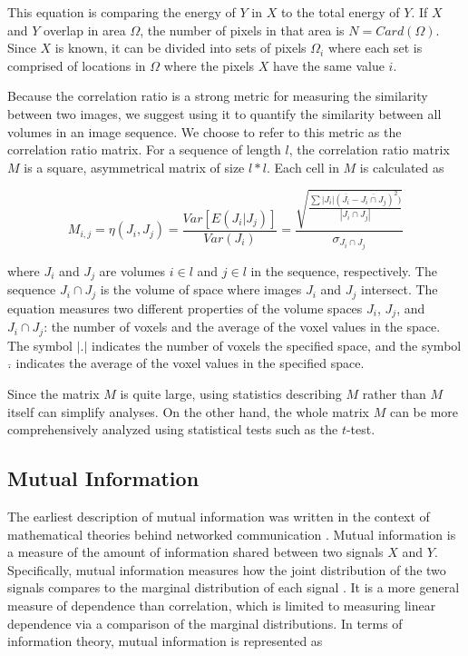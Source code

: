 \noindent This equation is comparing the energy of $Y$ in $X$ to the total energy of $Y$. If $X$ and $Y$ overlap in area $\Omega$, the number of pixels in that area is $N = Card(\Omega)$. Since $X$ is known, it can be divided into sets of pixels $\Omega_i$ where each set is comprised of locations in $\Omega$ where the pixels $X$ have the same value $i$. 

Because the correlation ratio is a strong metric for measuring the similarity between two images, we suggest using it to quantify the similarity between all volumes in an image sequence. We choose to refer to this metric as the correlation ratio matrix. For a sequence of length $l$, the correlation ratio matrix $M$ is a square, asymmetrical matrix of size $l*l$. Each cell in $M$ is calculated as

\begin{equation}
M_{i,j} = \eta(J_i, J_j) = \frac{Var[E(J_i|J_j)]}{Var(J_i)} =  \frac{\sqrt{\frac{\sum |J_i|(\overline{J_i} - \overline{J_i \cap J_j})^2)}{|J_i \cap J_j|}}}{\sigma_{J_i \cap J_j}}
\end{equation}

\noindent where $J_i$ and $J_j$ are volumes $i \in l$ and $j \in l$ in the sequence, respectively. The sequence $J_i \cap J_j$ is the volume of space where images $J_i$ and $J_j$ intersect. The equation measures two different properties of the volume spaces $J_i$, $J_j$, and $J_i \cap J_j$: the number of voxels and the average of the voxel values in the space. The symbol $|.|$ indicates the number of voxels the specified space, and the symbol $\overline{.}$ indicates the average of the voxel values in the specified space. %

Since the matrix $M$ is quite large, using statistics describing $M$ rather than $M$ itself can simplify analyses. On the other hand, the whole matrix $M$ can be more comprehensively analyzed using statistical tests such as the $t$-test.

\subsection{Mutual Information}

The earliest description of mutual information was written in the context of mathematical theories behind networked communication \cite{Shannon1948}. Mutual information is a measure of the amount of information shared between two signals $X$ and $Y$. Specifically, mutual information measures how the joint distribution of the two signals compares to the marginal distribution of each signal \cite{Li1990}. It is a more general measure of dependence than correlation, which is limited to measuring linear dependence via a comparison of the marginal distributions. In terms of information theory, mutual information is represented as

